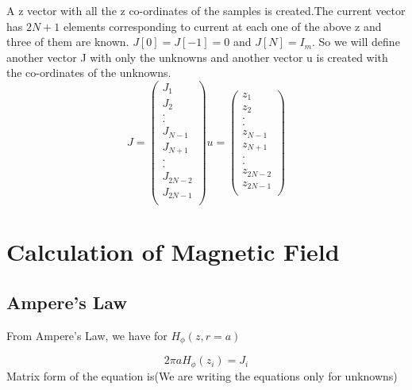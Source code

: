 \documentclass[12pt, a4paper]{report}
\begin{document}
A z vector with all the z co-ordinates of the samples is created.The current vector has $2N+1$ elements corresponding to current at each one of the above z and three of them are known. $J[0] = J[-1] = 0$ and $J[N]=I_m$. So we will define another vector J with only the unknowns and another vector u is created with the co-ordinates of the unknowns.
\begin{equation*}
J = 
  \begin{pmatrix}
    J_1\\
       J_2 \\
           .\\
           .\\
           J_{N-1}\\
           J_{N+1}\\
           .\\
           .\\
           J_{2N-2}\\
           J_{2N-1}\\
  \end{pmatrix}
 u= 
  \begin{pmatrix}
    z_1\\
       z_2 \\
           .\\
           .\\
           z_{N-1}\\
           z_{N+1}\\
           .\\
           .\\
           z_{2N-2}\\
           z_{2N-1}\\
  \end{pmatrix}
\end{equation*}

\section*{Calculation of Magnetic Field}
\subsection*{Ampere's Law}
From Ampere’s Law, we have for $H_\phi(z,r=a)$

\begin{equation*}
2\pi a H_\phi(z_i) = J_i
\end{equation*}
Matrix form of the equation is(We are writing the equations only for unknowns)
\end{document}
